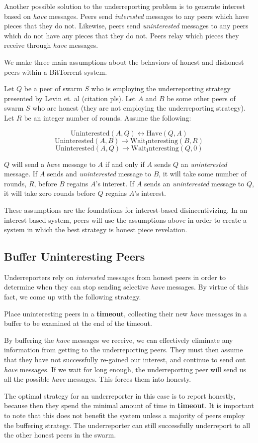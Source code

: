 Another possible solution to the underreporting problem is to generate interest based on \textit{have} messages. Peers send \textit{interested} messages to any peers which have pieces that they do not. Likewise, peers send \textit{uninterested} messages to any peers which do not have any pieces that they do not. Peers relay which pieces they receive through \textit{have} messages.

We make three main assumptions about the behaviors of honest and dishonest peers within a BitTorrent system.

Let $Q$ be a peer of swarm $S$ who is employing the underreporting strategy presented by Levin et. al (citation pls). Let $A$ and $B$ be some other peers of swarm $S$ who are honest (they are not employing the underreporting strategy). Let $R$ be an integer number of rounds. Assume the following:

$$ \mathrm{Uninterested}(A, Q) \longleftrightarrow \mathrm{Have}(Q, A) $$
$$ \mathrm{Uninterested}(A, B) \longrightarrow \mathrm{Wait_Interesting}(B, R) $$
$$ \mathrm{Uninterested}(A, Q) \longrightarrow \mathrm{Wait_Interesting}(Q, 0) $$\newline

$Q$ will send a \textit{have} message to $A$ if and only if $A$ sends $Q$ an \textit{uninterested} message. If $A$ sends and \textit{uninterested} message to $B$, it will take some number of rounds, $R$, before $B$ regains $A$'s interest. If $A$ sends an \textit{uninterested} message to $Q$, it will take zero rounds before $Q$ regains $A$'s interest.

These assumptions are the foundations for interest-based disincentivizing. In an interest-based system, peers will use the assumptions above in order to create a system in which the best strategy is honest piece revelation.

\subsection{Buffer Uninteresting Peers}

Underreporters rely on \textit{interested} messages from honest peers in order to determine when they can stop sending selective \textit{have} messages. By virtue of this fact, we come up with the following strategy.

Place uninteresting peers in a \textbf{timeout}, collecting their new \textit{have} messages in a buffer to be examined at the end of the timeout.

By buffering the \textit{have} messages we receive, we can effectively eliminate any information from getting to the underreporting peers. They must then assume that they have not successfully re-gained our interest, and continue to send out \textit{have} messages. If we wait for long enough, the underreporting peer will send us all the possible \textit{have} messages. This forces them into honesty.

The optimal strategy for an underreporter in this case is to report honestly, because then they spend the minimal amount of time in \textbf{timeout}. It is important to note that this does not benefit the system unless a majority of peers employ the buffering strategy. The underreporter can still successfully underreport to all the other honest peers in the swarm.
